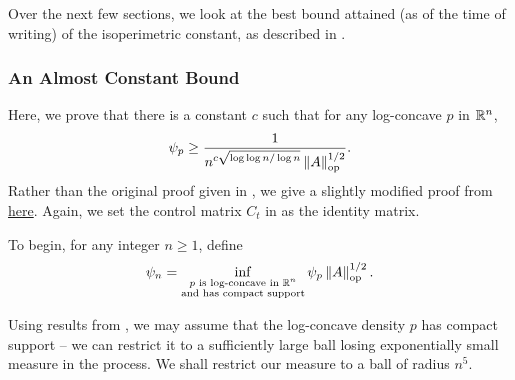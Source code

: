 		Over the next few sections, we look at the best bound attained (as of the time of writing) of the isoperimetric constant, as described in \cite{chen2021constant}.

	\subsubsection{An Almost Constant Bound}

		Here, we prove that there is a constant $c$ such that for any log-concave $p$ in $\mathbb{R}^n$,
		\[ \psi_p \geq \frac{1}{n^{c \sqrt{\log \log n / \log n}} \left\lVert A\right\rVert_{\text{op}}^{1/2}}. \]
		Rather than the original proof given in \cite{chen2021constant}, we give a slightly modified proof from \href{https://www.him.uni-bonn.de/fileadmin/him/Lecture_Notes/chen_lecture_notes.pdf}{here}. Again, we set the control matrix $C_t$ in  as the identity matrix.

		To begin, for any integer $n \geq 1$, define
		\[ \psi_n = \inf_{\substack{\text{$p$ is log-concave in $\mathbb{R}^n$} \\ \text{and has compact support}}} \psi_p\left\lVert A\right\rVert_{\text{op}}^{1/2}. \]

		Using results from \cite{Paouris2006}, we may assume that the log-concave density $p$ has compact support -- we can restrict it to a sufficiently large ball losing exponentially small measure in the process. We shall restrict our measure to a ball of radius $n^5$. %

